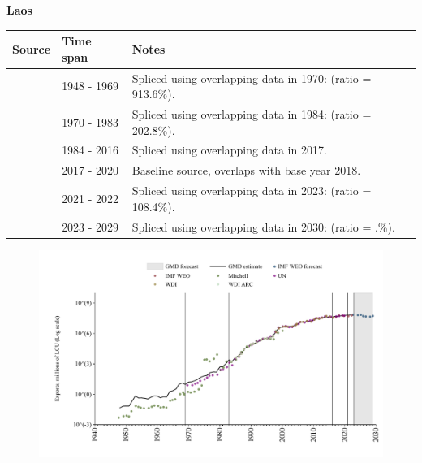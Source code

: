 \documentclass[12pt,a4paper,landscape]{article}
\begin{document}
\begin{adjustbox}{max totalsize={\paperwidth}{\paperheight},center}
\begin{minipage}[t][\textheight][t]{\textwidth}
\vspace*{0.5cm}
{}
\begin{center}
{\Large\bfseries Laos}
\end{center}
\vspace{0.5cm}
\begin{table}[H]
\centering
\small
\begin{tabular}{|l|l|l|}
\hline
\textbf{Source} & \textbf{Time span} & \textbf{Notes} \\
\hline
\rowcolor{white}\cite{Mitchell}& 1948 - 1969 &Spliced using overlapping data in 1970: (ratio = 913.6\%).\\
\rowcolor{lightgray}\cite{UN}& 1970 - 1983 &Spliced using overlapping data in 1984: (ratio = 202.8\%).\\
\rowcolor{white}\cite{WDI}& 1984 - 2016 &Spliced using overlapping data in 2017.\\
\rowcolor{lightgray}\cite{UN}& 2017 - 2020 &Baseline source, overlaps with base year 2018.\\
\rowcolor{white}\cite{IMF_WEO}& 2021 - 2022 &Spliced using overlapping data in 2023: (ratio = 108.4\%).\\
\rowcolor{lightgray}\cite{IMF_WEO_forecast}& 2023 - 2029 &Spliced using overlapping data in 2030: (ratio = .\%).\\
\hline
\end{tabular}
\end{table}
\begin{figure}[H]
\centering
\includegraphics[width=\textwidth,height=0.6\textheight,keepaspectratio]{graphs/LAO_exports.pdf}
\end{figure}
\end{minipage}
\end{adjustbox}
\end{document}
